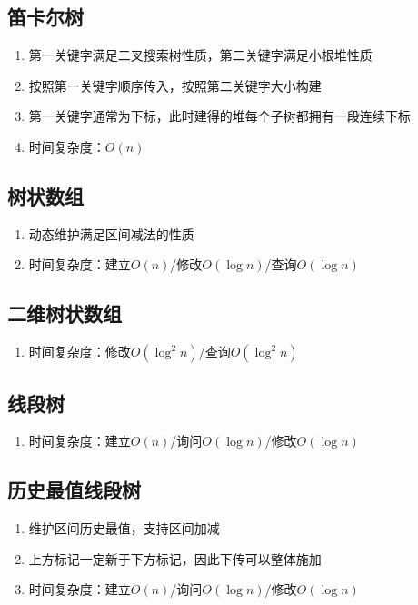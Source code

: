 \documentclass[twocolumn,a4,8pt]{article}  %
\begin{document}
	 	\subsection{笛卡尔树}
			\noindent\begin{enumerate}
				\item 第一关键字满足二叉搜索树性质，第二关键字满足小根堆性质
				\item 按照第一关键字顺序传入，按照第二关键字大小构建
				\item 第一关键字通常为下标，此时建得的堆每个子树都拥有一段连续下标
				\item 时间复杂度：$O(n)$
			\end{enumerate}
	 	 	

	 	\subsection{树状数组}
			\noindent\begin{enumerate}
				\item 动态维护满足区间减法的性质
				\item 时间复杂度：建立$O(n)$/修改$O(\log n)$/查询$O(\log n)$
			\end{enumerate}
	 	 	
	 	 	
	 	\subsection{二维树状数组}
			\noindent\begin{enumerate}
				\item 时间复杂度：修改$O(\log^2n)$/查询$O(\log^2n)$
			\end{enumerate}
	 	 	
	 	 	
	 	\subsection{线段树}
			\noindent\begin{enumerate}
				\item 时间复杂度：建立$O(n)$/询问$O(\log n)$/修改$O(\log n)$
			\end{enumerate}
	 	 	
	 	 	
		\subsection{历史最值线段树}
			\noindent\begin{enumerate}
			 	\item 维护区间历史最值，支持区间加减
			 	\item 上方标记一定新于下方标记，因此下传可以整体施加
				\item 时间复杂度：建立$O(n)$/询问$O(\log n)$/修改$O(\log n)$
			\end{enumerate}
	 	 	
	 	 	
\end{document}
